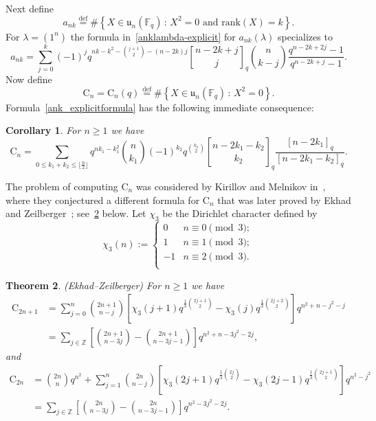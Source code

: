 \documentclass[12pt,a4paper,reqno]{amsart}
\theoremstyle{plain}
\newtheorem{theorem}{Theorem}[section]
\newtheorem{corollary}[theorem]{Corollary}
\theoremstyle{definition}
\newcommand{\defin}{\overset{\mathrm{def}}{=}}
\newcommand{\ZZ}{{\mathbb{Z}}}
\newcommand{\FF}{{\mathbb{F}}}
\newcommand{\1}{\mathds{1}}
\renewcommand{\u}{\mathfrak{u}}
\begin{document}
Next define
\[
a_{nk}\defin\#\left\{X\in\u_n(\FF_q)\,:\,X^2=0\text{ and }\mathrm{rank}(X)=k\right\}.
\]
For $\lambda=(1^n)$ 
the 
formula in~\cref{anklambda-explicit} for $a_{nk}(\lambda)$ specializes to \begin{equation}\label{ank_explicitformula}
a_{nk}=\sum_{j=0}^k(-1)^jq^{nk-k^2-\binom{j+1}{2}-(n-2k)j}{n-2k+j \brack j}_q\binom{n}{k-j}\frac{q^{n-2k+2j}-1}{q^{n-2k+j}-1}.
\end{equation}
Now define
\[
\mathrm{C}_n=\mathrm{C}_n(q)\defin\#
\left\{X\in\u_n(\FF_q)\,:\,X^2=0\right\}.
\]
Formula~\cref{ank_explicitformula} has the following immediate consequence:
\begin{corollary}
\label{cor-diffekhad}
For $n\geq 1 $ we have \begin{equation*}
\mathrm{C}_{n}=
\sum_{0\leq k_1+k_2\leq\lfloor\frac n 2 \rfloor}q^{nk_1-k_1^2}\binom{n}{k_1}
(-1)^{k_2}q^{\binom{k_2}{2}}{n-2k_1-k_2 \brack k_2}_q\frac{[n-2k_1]_q}{[n-2k_1-k_2]_q}
.\end{equation*}
\end{corollary}
The problem of computing $\mathrm{C}_n$ was considered by Kirillov and Melnikov in~\cite{KirillovMelnikov}, where they conjectured a different formula for $\mathrm{C}_n$ that was later proved by Ekhad and Zeilberger~\cite{Ekhad}; see~\cref{Ekhad_thm} below.
Let $\chi_3$ be the Dirichlet character defined by
\begin{equation}\label{Dirichlet}
\chi_3(n):=\begin{cases}
0 & n\equiv 0\pmod{3};\\
1 & n\equiv 1\pmod{3};\\
-1 &  n\equiv 2\pmod{3}.\\
\end{cases}
\end{equation}
\begin{theorem}\label{Ekhad_thm}  (Ekhad--Zeilberger) For $n\geq 1$ we have 
\begin{equation*}
    \begin{split}
        \mathrm{C}_{2n+1}&=\sum_{j=0}^n \binom{2n+1}{n-j}\left[\chi_3(j+1)q^{\frac{1}{3}\binom{2j+1}{2}}-\chi_3(j)q^{\frac{1}{3}\binom{2j+2}{2}}\right]q^{n^2+n-j^2-j}\\
        &=\sum_{j\in\ZZ}\left[\binom{2n+1}{n-3j}-\binom{2n+1}{n-3j-1}\right]q^{n^2+n-3j^2-2j},        
    \end{split}
\end{equation*}
 and
\begin{equation*}
    \begin{split}
         \mathrm{C}_{2n}&= \binom{2n}{n}q^{n^2}+\sum_{j=1}^{n}\binom{2n}{n-j}\left[\chi_3(2j+1)q^{\frac{1}{3}\binom{2j}{2}}-\chi_3(2j-1)q^{\frac{1}{3}\binom{2j+1}{2}}\right]q^{n^2-j^2}\\
        &=\sum_{j\in\ZZ}\left[\binom{2n}{n-3j}-\binom{2n}{n-3j-1}\right]q^{n^2-3j^2-2j}.      
    \end{split}
\end{equation*}  
\end{theorem}
\end{document}
